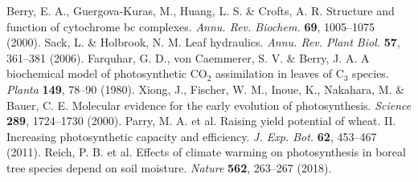 \documentclass[12pt]{article}
\begin{document}
\begin{thebibliography}{39}
 Berry, E. A., Guergova-Kuras, M., Huang, L. S. \& Crofts, A. R. Structure and function of cytochrome bc complexes. \textit{Annu. Rev. Biochem.} \textbf{69}, 1005--1075 (2000).
 Sack, L. \& Holbrook, N. M. Leaf hydraulics. \textit{Annu. Rev. Plant Biol.} \textbf{57}, 361--381 (2006).
 Farquhar, G. D., von Caemmerer, S. V. \& Berry, J. A. A biochemical model of photosynthetic CO$_2$ assimilation in leaves of C$_3$ species. \textit{Planta} \textbf{149}, 78--90 (1980).
 Xiong, J., Fischer, W. M., Inoue, K., Nakahara, M. \& Bauer, C. E. Molecular evidence for the early evolution of photosynthesis. \textit{Science} \textbf{289}, 1724--1730 (2000).
 Parry, M. A. et al. Raising yield potential of wheat. II. Increasing photosynthetic capacity and efficiency. \textit{J. Exp. Bot.} \textbf{62}, 453--467 (2011).
 Reich, P. B. et al. Effects of climate warming on photosynthesis in boreal tree species depend on soil moisture. \textit{Nature} \textbf{562}, 263--267 (2018).
\end{thebibliography}
\end{document}
